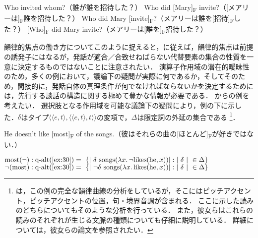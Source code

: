 \documentclass{goken}
\newcommand{\ori}[1]{\noindent\textcolor[gray]{0.7}{\fontsize{8pt}{8pt}\selectfont{\textsf{(p.~#1)}}} }
\begin{document}
\setcounter{exx}{26}
\begin{exe}
	\ex\label{ex:re:27}
	\begin{xlist}
    \ex\label{ex:re:27a} Who invited whom?（誰が誰を招待した？）
    \ex\label{ex:re:27b} Who did [Mary]\textsubscript{F} invite?（[メアリーは]\textsubscript{F}誰を招待した？）
    \ex\label{ex:re:27c} Who did Mary [invite]\textsubscript{F}?（メアリーは誰を[招待]\textsubscript{F}した？）
    \ex\label{ex:re:27d} [Who]\textsubscript{F} did Mary invite?（メアリーは[誰を]\textsubscript{F}招待した？）
  \end{xlist}
\end{exe}

\ori{35}
韻律的焦点の働き方についてこのように捉えると，\citealt{KadmonRoberts1986}に従えば，韻律的焦点は前提の誘発子にはなるが，発話が適合／合致せねばらない代替要素の集合の性質を一意に決定するものではないことに注意されたい．
演算子作用域の潜在的曖昧性のため，多くの例において，議論下の疑問が実際に何であるか，そしてそのため，間接的に，発話自体の真理条件が何でなければならないかを決定するためには，先行する談話の構造に関する極めて豊かな情報が必要である．
\citealt{KadmonRoberts1986}からの例を考えたい．
選択肢となる作用域を可能な議論下の疑問により，例の下に示した．$\delta$はタイプ$\langle \langle e, t\rangle, \langle \langle e, t \rangle, t \rangle \rangle$の変項で，$\Delta$は限定詞の外延の集合である
\footnote{%
  \citet{KadmonRoberts1986}は，この例の完全な韻律曲線の分析をしているが，そこにはピッチアクセント，ピッチアクセントの位置，句・境界音調が含まれる．
  ここに示した読みのどちらについてもそのような分析を行っている．
  また，彼女らはこれらの読みのそれぞれが生じる文脈の種類についても仔細に説明している．
  詳細については，彼女らの論文を参照されたい．
}．

\setcounter{exx}{29}
\begin{exe}
	\ex\label{ex:30} He doesn't like [most]\textsubscript{F} of the songs.（彼はそれらの曲の[ほとんど]\textsubscript{F}が好きではない．）
%
	\begin{xlist}
		\ex\label{ex:30a} $\text{most}(\neg): \text{q-alt}(\ref{ex:30}) =\ \{|\ \delta\ \text{songs}(\lambda x .\, \neg \text{likes}(\text{he}, x)) | : |\ \delta\ |\ \in \Delta\}$
		\ex\label{ex:30b} $\neg(\text{most}): \text{q-alt}(\ref{ex:30}) =\ \{|\ \neg\delta\ \text{songs}(\lambda x .\, \text{likes}(\text{he}, x)) | : |\ \delta\ |\ \in \Delta\}$
  \end{xlist}
\end{exe}
\end{document}
